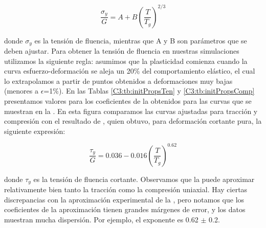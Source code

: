\begin{equation}\label{C3:eq:onsetPlast}
\frac{\sigma{}_{y}}{G} = A+B\left( \frac{T}{T_g} \right)^{2/3}
\end{equation}

donde $\sigma{}_{y}$ es la tensión de fluencia, mientras que A y B son parámetros que se deben ajustar. Para obtener la tensión de fluencia en nuestras simulaciones utilizamos la siguiente regla: asumimos que la plasticidad comienza cuando la curva esfuerzo-deformación se aleja un 20\% del comportamiento elástico, el cual lo extrapolamos a partir de puntos obtenidos a deformaciones muy bajas (menores a $\epsilon$=1\%). En las Tablas \ref{C3:tb:initPropsTen} y \ref{C3:tb:initPropsComp} presentamos valores para los coeficientes de la  obtenidos para las curvas que se muestran en la . En esta figura comparamos las curvas ajustadas para tracción y compresión con el resultado de \cite{johnson05}, quien obtuvo, para  deformación cortante pura, la siguiente expresión:


\begin{equation}\label{C3:eq:johnsonSamwer}
\frac{\tau _{y}}{G} = 0.036-0.016\left( \frac{T}{T_g} \right)^{0.62}
\end{equation}

donde $\tau _{y}$ es la tensión de fluencia cortante. Observamos que la  puede aproximar relativamente bien tanto la tracción como la compresión uniaxial. Hay ciertas discrepancias con la aproximación experimental de la , pero notamos que los coeficientes de la aproximación tienen grandes márgenes de error, y los datos muestran mucha dispersión. Por ejemplo, el exponente es 0.62 $\pm$ 0.2.
	

